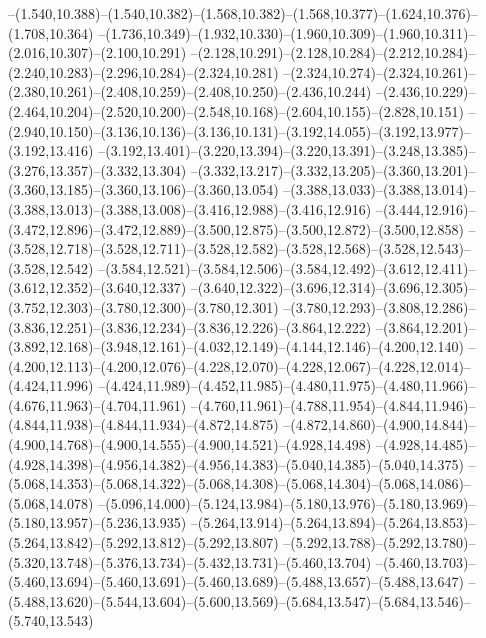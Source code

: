  --(1.540,10.388)--(1.540,10.382)--(1.568,10.382)--(1.568,10.377)--(1.624,10.376)--(1.708,10.364)%
  --(1.736,10.349)--(1.932,10.330)--(1.960,10.309)--(1.960,10.311)--(2.016,10.307)--(2.100,10.291)%
  --(2.128,10.291)--(2.128,10.284)--(2.212,10.284)--(2.240,10.283)--(2.296,10.284)--(2.324,10.281)%
  --(2.324,10.274)--(2.324,10.261)--(2.380,10.261)--(2.408,10.259)--(2.408,10.250)--(2.436,10.244)%
  --(2.436,10.229)--(2.464,10.204)--(2.520,10.200)--(2.548,10.168)--(2.604,10.155)--(2.828,10.151)%
  --(2.940,10.150)--(3.136,10.136)--(3.136,10.131)--(3.192,14.055)--(3.192,13.977)--(3.192,13.416)%
  --(3.192,13.401)--(3.220,13.394)--(3.220,13.391)--(3.248,13.385)--(3.276,13.357)--(3.332,13.304)%
  --(3.332,13.217)--(3.332,13.205)--(3.360,13.201)--(3.360,13.185)--(3.360,13.106)--(3.360,13.054)%
  --(3.388,13.033)--(3.388,13.014)--(3.388,13.013)--(3.388,13.008)--(3.416,12.988)--(3.416,12.916)%
  --(3.444,12.916)--(3.472,12.896)--(3.472,12.889)--(3.500,12.875)--(3.500,12.872)--(3.500,12.858)%
  --(3.528,12.718)--(3.528,12.711)--(3.528,12.582)--(3.528,12.568)--(3.528,12.543)--(3.528,12.542)%
  --(3.584,12.521)--(3.584,12.506)--(3.584,12.492)--(3.612,12.411)--(3.612,12.352)--(3.640,12.337)%
  --(3.640,12.322)--(3.696,12.314)--(3.696,12.305)--(3.752,12.303)--(3.780,12.300)--(3.780,12.301)%
  --(3.780,12.293)--(3.808,12.286)--(3.836,12.251)--(3.836,12.234)--(3.836,12.226)--(3.864,12.222)%
  --(3.864,12.201)--(3.892,12.168)--(3.948,12.161)--(4.032,12.149)--(4.144,12.146)--(4.200,12.140)%
  --(4.200,12.113)--(4.200,12.076)--(4.228,12.070)--(4.228,12.067)--(4.228,12.014)--(4.424,11.996)%
  --(4.424,11.989)--(4.452,11.985)--(4.480,11.975)--(4.480,11.966)--(4.676,11.963)--(4.704,11.961)%
  --(4.760,11.961)--(4.788,11.954)--(4.844,11.946)--(4.844,11.938)--(4.844,11.934)--(4.872,14.875)%
  --(4.872,14.860)--(4.900,14.844)--(4.900,14.768)--(4.900,14.555)--(4.900,14.521)--(4.928,14.498)%
  --(4.928,14.485)--(4.928,14.398)--(4.956,14.382)--(4.956,14.383)--(5.040,14.385)--(5.040,14.375)%
  --(5.068,14.353)--(5.068,14.322)--(5.068,14.308)--(5.068,14.304)--(5.068,14.086)--(5.068,14.078)%
  --(5.096,14.000)--(5.124,13.984)--(5.180,13.976)--(5.180,13.969)--(5.180,13.957)--(5.236,13.935)%
  --(5.264,13.914)--(5.264,13.894)--(5.264,13.853)--(5.264,13.842)--(5.292,13.812)--(5.292,13.807)%
  --(5.292,13.788)--(5.292,13.780)--(5.320,13.748)--(5.376,13.734)--(5.432,13.731)--(5.460,13.704)%
  --(5.460,13.703)--(5.460,13.694)--(5.460,13.691)--(5.460,13.689)--(5.488,13.657)--(5.488,13.647)%
  --(5.488,13.620)--(5.544,13.604)--(5.600,13.569)--(5.684,13.547)--(5.684,13.546)--(5.740,13.543)%
